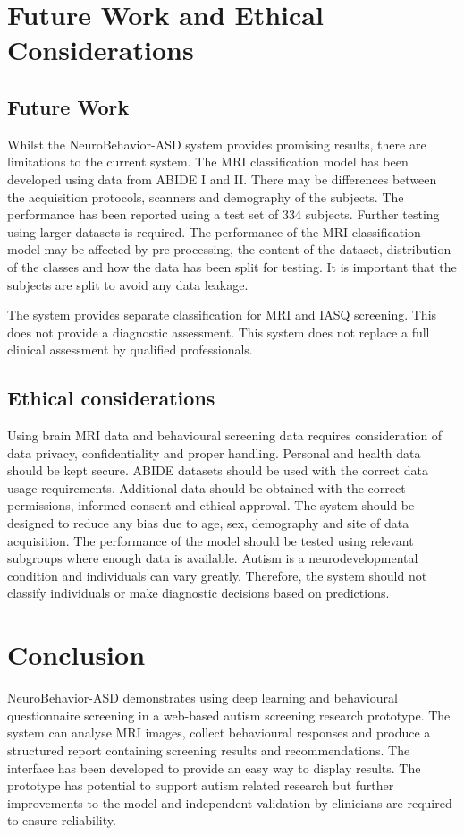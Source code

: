 \documentclass[conference]{IEEEtran}
\begin{document}
\section{Future Work and Ethical Considerations}

\subsection{Future Work}
Whilst the NeuroBehavior-ASD system provides promising results, there are limitations to the current system. The MRI classification model has been developed using data from ABIDE I and II. There may be differences between the acquisition protocols, scanners and demography of the subjects. The performance has been reported using a test set of 334 subjects. Further testing using larger datasets is required. The performance of the MRI classification model may be affected by pre-processing, the content of the dataset, distribution of the classes and how the data has been split for testing. It is important that the subjects are split to avoid any data leakage.

The system provides separate classification for MRI and IASQ screening. This does not provide a diagnostic assessment. This system does not replace a full clinical assessment by qualified professionals.

\subsection{Ethical considerations}
Using brain MRI data and behavioural screening data requires consideration of data privacy, confidentiality and proper handling. Personal and health data should be kept secure. ABIDE datasets should be used with the correct data usage requirements. Additional data should be obtained with the correct permissions, informed consent and ethical approval. The system should be designed to reduce any bias due to age, sex, demography and site of data acquisition. The performance of the model should be tested using relevant subgroups where enough data is available. Autism is a neurodevelopmental condition and individuals can vary greatly. Therefore, the system should not classify individuals or make diagnostic decisions based on predictions.

\section{Conclusion}
NeuroBehavior-ASD demonstrates using deep learning and behavioural questionnaire screening in a web-based autism screening research prototype. The system can analyse MRI images, collect behavioural responses and produce a structured report containing screening results and recommendations. The interface has been developed to provide an easy way to display results. The prototype has potential to support autism related research but further improvements to the model and independent validation by clinicians are required to ensure reliability.
\end{document}
